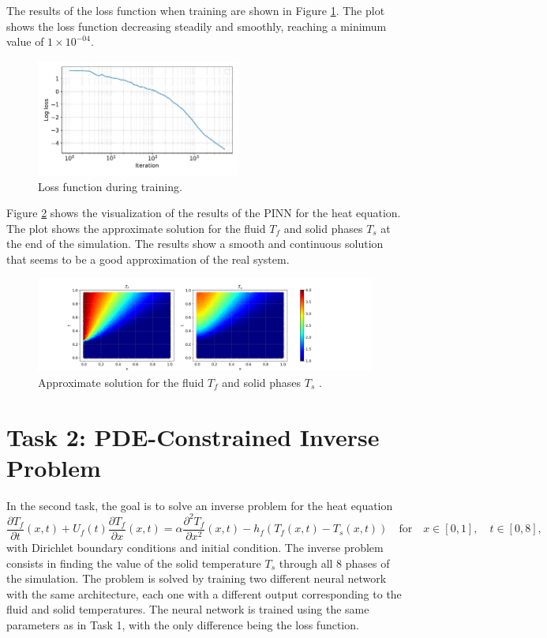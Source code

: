\documentclass[unicode,11pt,a4paper,oneside,numbers=endperiod,openany]{scrartcl}
\begin{document}
The results of the loss function when training are shown in Figure
\ref{fig:task1_loss}. The plot shows the loss function decreasing steadily and
smoothly, reaching a minimum value of $1\times 10^{-04}$.
\begin{figure}[h]
    \centering
    \includegraphics[width=0.6\textwidth]{../Proj1_Y24/Task1/loss.pdf}
    \caption{Loss function during training.}
    \label{fig:task1_loss}
\end{figure}
Figure \ref{fig:task1} shows the visualization of the results of the PINN for
the heat equation. The plot shows the approximate solution for the fluid $T_f$
and solid phases $T_s$ at the end of the simulation. The results show a smooth
and continuous solution that seems to be a good approximation of the real system.

\begin{figure}[h]
    \centering
    \includegraphics[width=1.2\textwidth]{../Proj1_Y24/Task1/output.png}
    \caption{Approximate solution for the fluid $T_f$ and solid phases $T_s$ .}
    \label{fig:task1}
\end{figure}



\section{Task 2: PDE-Constrained Inverse Problem}
In the second task, the goal is to solve an inverse problem for the heat
equation
\begin{equation}
    \frac{\partial T_f}{\partial t}(x,t) + U_f(t)\frac{\partial T_f}{\partial x}(x,t) = \alpha \frac{\partial^2 T_f}{\partial x^2} (x,t) - h_f(T_f(x,t)-T_s(x,t)) \quad \text{for} \quad x \in [0, 1], \quad t \in [0, 8],
\end{equation}
with Dirichlet boundary conditions and initial condition. The inverse problem
consists in finding the value of the solid temperature $T_s$ through all 8
phases of the simulation. The problem is solved by training two different neural
network with the same architecture, each one with a different output
corresponding to the fluid and solid temperatures. The neural network is trained
using the same parameters as in Task 1, with the only difference being the loss function.
\end{document}
